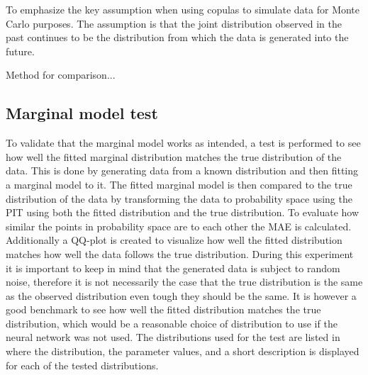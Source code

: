 To emphasize the key assumption when using copulas to simulate data for Monte Carlo purposes. The assumption is that the joint distribution observed in the past continues to be the distribution from which the data is generated into the future. 

Method for comparison...





\subsection{Marginal model test}
To validate that the marginal model works as intended, a test is performed to see how well the fitted marginal distribution matches the true distribution of the data. This is done by generating data from a known distribution and then fitting a marginal model to it. The fitted marginal model is then compared to the true distribution of the data by transforming the data to probability space using the \gls{PIT} using both the fitted distribution and the true distribution. To evaluate how similar the points in probability space are to each other the \gls{MAE} is calculated. Additionally a QQ-plot is created to visualize how well the fitted distribution matches how well the data follows the true distribution. During this experiment it is important to keep in mind that the generated data is subject to random noise, therefore it is not necessarily the case that the true distribution is the same as the observed distribution even tough they should be the same. It is however a good benchmark to see how well the fitted distribution matches the true distribution, which would be a reasonable choice of distribution to use if the neural network was not used. The distributions used for the test are listed in  where the distribution, the parameter values, and a short description is displayed for each of the tested distributions.


